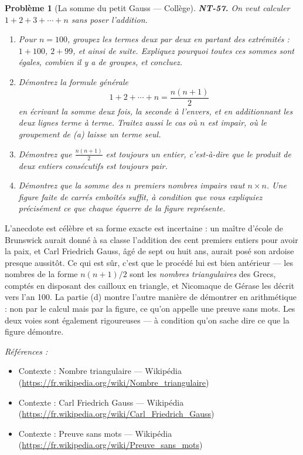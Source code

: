 \documentclass[11pt]{article}
\newtheorem{problem}{Problème}
\newenvironment{refs}{\par\small\noindent\emph{Références :}\begin{itemize}\setlength\itemsep{0pt}}{\end{itemize}\normalsize}
\begin{document}
\begin{problem}[{La somme du petit Gauss --- Collège}]
\textbf{NT-57.} On veut calculer $ 1 + 2 + 3 + \cdots + n $ sans poser l'addition.
\begin{enumerate}
\item[(a)] Pour $ n = 100 $, groupez les termes deux par deux en partant des extrémités : $ 1 + 100 $,
$ 2 + 99 $, et ainsi de suite. Expliquez pourquoi toutes ces sommes sont égales, combien il y a de
groupes, et concluez.
\item[(b)] Démontrez la formule générale
\[ 1 + 2 + \cdots + n = \frac{n(n+1)}{2} \]
en écrivant la somme deux fois, la seconde à l'envers, et en additionnant les deux lignes terme à
terme. Traitez aussi le cas où $ n $ est impair, où le groupement de (a) laisse un terme seul.
\item[(c)] Démontrez que $ \frac{n(n+1)}{2} $ est toujours un entier, c'est-à-dire que le produit de deux
entiers consécutifs est toujours pair.
\item[(d)] Démontrez que la somme des $ n $ premiers nombres impairs vaut $ n \times n $. Une figure
faite de carrés emboîtés suffit, à condition que vous expliquiez précisément ce que chaque équerre de
la figure représente.
\end{enumerate}

\end{problem}

\noindent L'anecdote est célèbre et sa forme exacte est incertaine : un maître d'école de
Brunswick aurait donné à sa classe l'addition des cent premiers entiers pour avoir la paix, et Carl
Friedrich Gauss, âgé de sept ou huit ans, aurait posé son ardoise presque aussitôt. Ce qui est sûr,
c'est que le procédé lui est bien antérieur --- les nombres de la forme $ n(n+1)/2 $ sont les
\textit{nombres triangulaires} des Grecs, comptés en disposant des cailloux en triangle, et Nicomaque de
Gérase les décrit vers l'an 100. La partie (d) montre l'autre manière de démontrer en arithmétique :
non par le calcul mais par la figure, ce qu'on appelle une preuve sans mots. Les deux voies sont
également rigoureuses --- à condition qu'on sache dire ce que la figure démontre.

\begin{refs}
\item Contexte : Nombre triangulaire --- Wikipédia (\url{https://fr.wikipedia.org/wiki/Nombre_triangulaire})
\item Contexte : Carl Friedrich Gauss --- Wikipédia (\url{https://fr.wikipedia.org/wiki/Carl_Friedrich_Gauss})
\item Contexte : Preuve sans mots --- Wikipédia (\url{https://fr.wikipedia.org/wiki/Preuve_sans_mots})
\end{refs}
\end{document}
